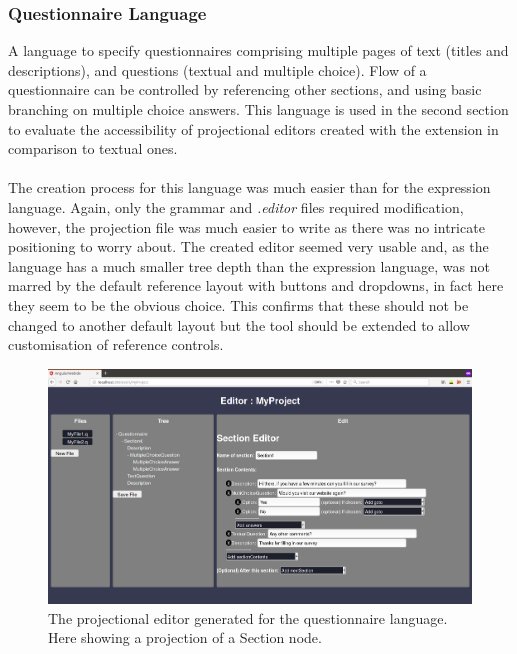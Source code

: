 \documentclass{article}
\begin{document}
{%

\subsubsection{Questionnaire Language}\label{questionnaireLang}
A language to specify questionnaires comprising multiple pages of text (titles and descriptions), and questions (textual and multiple choice). Flow of a questionnaire can be controlled by referencing other sections, and using basic branching on multiple choice answers. This language is used in the second section to evaluate the accessibility of projectional editors created with the extension in comparison to textual ones.
\\
\\
The creation process for this language was much easier than for the expression language. Again, only the grammar and \emph{.editor} files required modification, however, the projection file was much easier to write as there was no intricate positioning to worry about. The created editor seemed very usable and, as the language has a much smaller tree depth than the expression language, was not marred by the default reference layout with buttons and dropdowns, in fact here they seem to be the obvious choice. This confirms that these should not be changed to another default layout but the tool should be extended to allow customisation of reference controls.
\begin{figure}[h!]
  \centering
  \includegraphics[width=\linewidth]{./Screenshots/questionnaireUI3.png}
  \caption{The projectional editor generated for the questionnaire language. Here showing a projection of a Section node.}
  \label{fig:questionnaireUI}
\end{figure}

}
\end{document}
